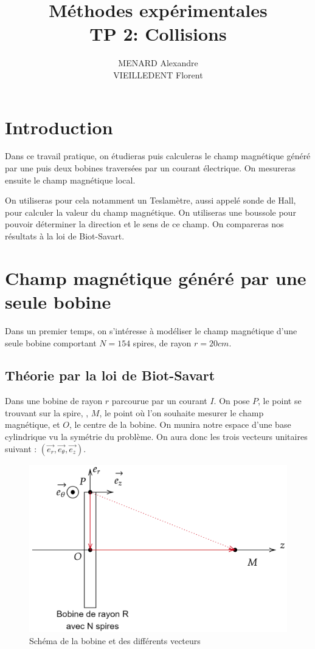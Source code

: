 \documentclass[12pt]{article}
\title{\textbf{Méthodes expérimentales} \\ TP 2: Collisions}
\author{MENARD Alexandre \\ VIEILLEDENT Florent}
\begin{document}
\maketitle

\section*{Introduction}

Dans ce travail pratique, on étudieras puis calculeras le champ magnétique généré par une puis deux bobines traversées par un courant électrique. On mesureras ensuite le champ magnétique local. 

On utiliseras pour cela notamment un Teslamètre, aussi appelé sonde de Hall, pour calculer la valeur du champ magnétique. On utiliseras une boussole pour pouvoir déterminer la direction et le sens de ce champ. On compareras nos résultats à la loi de Biot-Savart. 

\newpage
\section{Champ magnétique généré par une seule bobine}
Dans un premier temps, on s'intéresse à modéliser le champ magnétique d'une seule bobine comportant 
$N = 154$ spires, de rayon $r = 20cm$.

\subsection{Théorie par la loi de Biot-Savart}
Dans une bobine de rayon $r$ parcourue par un courant $I$. On pose $P$, le point se trouvant sur la spire,
, $M$, le point où l'on souhaite mesurer le champ magnétique, et $O$, le centre de la bobine. On munira notre espace d'une base cylindrique vu
la symétrie du problème. On aura donc les trois vecteurs unitaires suivant : $(\vec{e_r}, \vec{e_\theta}, \vec{e_z})$.

\begin{figure}[h!]
    \begin{center}
        \includegraphics[scale=0.4]{img/theorie.png}
    \end{center}
    \caption{Schéma de la bobine et des différents vecteurs}
\end{figure}
\end{document}
